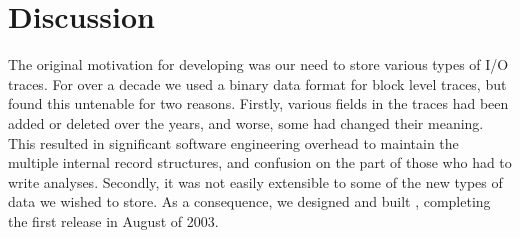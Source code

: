 \section{Discussion}\label{sec:discussion}

The original motivation for developing \DataSeries{} was our need to
store various types of I/O traces. For over a decade we used a
binary data format for block level traces,
but found this untenable for two
reasons. Firstly, various fields in the traces had been added or
deleted over the years, and worse, some had changed their
meaning. This resulted in significant software engineering overhead
to maintain the multiple internal record structures, and confusion on the
part of those who had to write analyses. Secondly, it was not easily
extensible to some of the new types of data we wished to store. As a
consequence, we designed and built \DataSeries{}, completing the first
release in August of 2003.  



